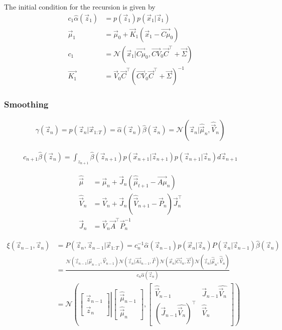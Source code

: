 \documentclass[12pt,twoside]{article}
\begin{document}
The initial condition for the recursion is given by
\begin{align*}
	c_1\hat{\alpha}(\vec{z}_1)	& = p(\vec{z}_1) p(\vec{x}_1 \vert \vec{z}_1)\\
	\vec{\mu}_1							& = \vec{\mu}_0 + \vec{K}_1(\vec{x}_1-\vec{C\mu}_0)\\
	c_1										& = \mathcal{N}(\vec{x}_1\vert \vec{C\mu}_0, \vec{CV}_0\vec{C}^\top +\vec{\Sigma})\\
	\vec{K_1}								& = \vec{V}_0 \vec{C}^\top(\vec{CV}_0\vec{C}^\top + \vec{\Sigma})^{-1}
\end{align*}

\subsubsection{Smoothing}
\begin{align*}
	\gamma(\vec{z}_n) = p(\vec{z}_n \vert \vec{x}_{1:T}) = \hat{\alpha}(\vec{z}_n)\hat{\beta}(\vec{z}_n) = \mathcal{N}(\vec{z}_n\vert \hat{\vec{\mu}}_n, \hat{\vec{V}}_n)
\end{align*}

\begin{align*}
	c_{n+1}\hat{\beta}(\vec{z}_n) = \int_{z_{n+1}}\hat{\beta}(\vec{z}_{n+1})p(\vec{x}_{n+1}\vert \vec{z}_{n+1})p(\vec{z}_{n+1}\vert \vec{z}_n)d\vec{z}_{n+1}
\end{align*}

\begin{align*}
	\hat{\vec{\mu}}	&= \vec{\mu}_n + \vec{J}_n(\hat{\vec{\mu}}_{t+1}- \vec{A\mu}_n)\\
	\hat{\vec{V}}_n	&=\vec{V}_n + \vec{J}_n (\hat{\vec{V}}_{n+1}- \vec{P}_n)\vec{J}_n^\top\\
	\vec{J}_n 				&= \vec{V}_n \vec{A}^\top \vec{P}_n^{-1} 
\end{align*}

\begin{align*}
	\xi(\vec{z}_{n-1}, \vec{z}_n)
		&= P(\vec{z}_n, \vec{z}_{n-1}\vert \vec{x}_{1:T}) = c_n^{-1} \hat{\alpha}(\vec{z}_{n-1})p(\vec{x}_n\vert \vec{z}_n)P(\vec{z}_n\vert \vec{z}_{n-1})\hat{\beta}(\vec{z}_n)\\
		&= \frac{\mathcal{N}(\vec{z}_{n-1}\vert \vec{\mu}_{n-1}, \vec{V}_{n-1})\mathcal{N}(\vec{z}_n \vert \vec{Az}_{n-1}, \vec{\Gamma})\mathcal{N}(\vec{x}_n \vert \vec{Cz}_n, \vec{\Sigma}) \mathcal{N}(\vec{z}_n \vert \hat{\vec{\mu}}_n, \hat{\vec{V}}_n )}{c_n\hat{\alpha}(\vec{z}_n)}\\
		& = \mathcal{N} \left(\left.
		\begin{bmatrix}
			\vec{z}_{n-1}\\ \vec{z}_n
		\end{bmatrix}
		\right\vert
		\begin{bmatrix}
			\hat{\vec{\mu}}_{n-1}\\
			\hat{\vec{\mu}}_n			
		\end{bmatrix}
		,
		\begin{bmatrix}
			\hat{\vec{V}}_{n-1}								&	\vec{J}_{n-1}\hat{\vec{V}_n}\\
			(\vec{J}_{n-1}\hat{\vec{V}_n})^\top	&	\hat{\vec{V}}_{n}
		\end{bmatrix}\right)
\end{align*}
\end{document}
